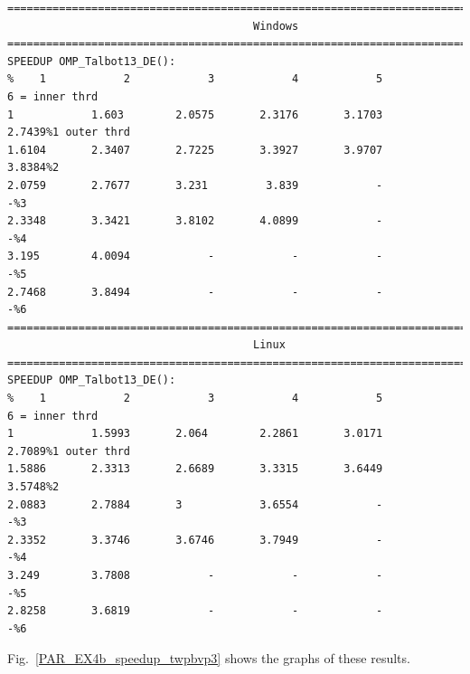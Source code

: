\documentclass[a4paper,10pt]{report}%
\begin{document}
\begin{lstlisting}
====================================================================================
                                      Windows
====================================================================================
SPEEDUP OMP_Talbot13_DE():
%    1            2            3            4            5            6 = inner thrd
1            1.603        2.0575       2.3176       3.1703       2.7439%1 outer thrd
1.6104       2.3407       2.7225       3.3927       3.9707       3.8384%2
2.0759       2.7677       3.231         3.839            -            -%3
2.3348       3.3421       3.8102       4.0899            -            -%4
3.195        4.0094            -            -            -            -%5
2.7468       3.8494            -            -            -            -%6
====================================================================================
                                      Linux
====================================================================================
SPEEDUP OMP_Talbot13_DE():
%    1            2            3            4            5            6 = inner thrd
1            1.5993       2.064        2.2861       3.0171       2.7089%1 outer thrd
1.5886       2.3313       2.6689       3.3315       3.6449       3.5748%2
2.0883       2.7884       3            3.6554            -            -%3
2.3352       3.3746       3.6746       3.7949            -            -%4
3.249        3.7808            -            -            -            -%5
2.8258       3.6819            -            -            -            -%6
\end{lstlisting}
Fig.~\ref{PAR_EX4b_speedup_twpbvp3} shows the graphs of these results.
\end{document}

